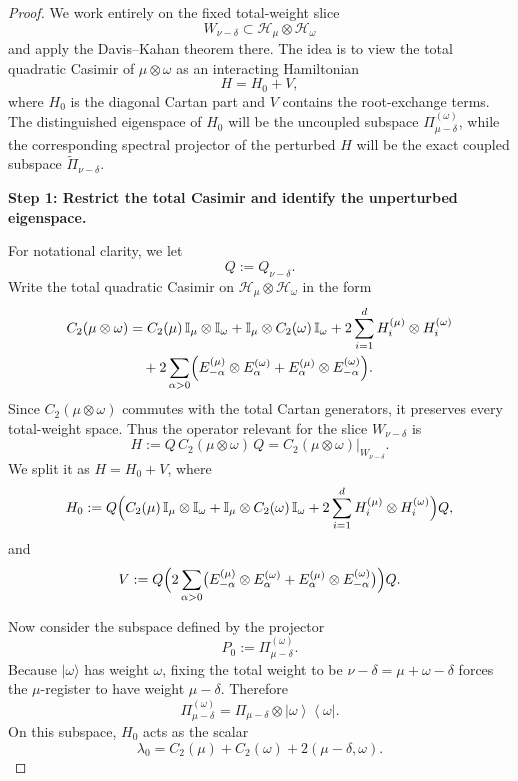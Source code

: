 \documentclass[a4paper,onecolumn,11pt]{quantumarticle}
\newcommand{\ket}[1]{| #1 \rangle}
\newcommand{\ketbra}[2]{\left|#1\right\rangle\!\!\left\langle #2\right|}
\def\id{\mathbb{I}}
\begin{document}
\begin{proof}
We work entirely on the fixed total-weight slice
\[
W_{\nu-\delta}\subset \mathcal H_\mu\otimes \mathcal H_\omega
\]
and apply the Davis--Kahan theorem there. The idea is to view the total quadratic Casimir of $\mu\otimes\omega$ as an interacting Hamiltonian
\[
H=H_0+V,
\]
where \(H_0\) is the diagonal Cartan part and \(V\) contains the root-exchange terms. The distinguished eigenspace of \(H_0\) will be the uncoupled subspace \(\Pi_{\mu-\delta}^{(\omega)}\), while the corresponding spectral projector of the perturbed \(H\) will be the exact coupled subspace \(\widetilde{\Pi}_{\nu-\delta}\).

\medskip
\noindent\textbf{Step 1: Restrict the total Casimir and identify the unperturbed eigenspace.}

For notational clarity, we let
\[
Q:=Q_{\nu-\delta}.
\]
Write the total quadratic Casimir on \(\mathcal H_\mu\otimes\mathcal H_\omega\) in the form
\begin{equation}
\begin{aligned}
    C_2(\mu\otimes\omega)
    &=
    C_2(\mu)\,\id_\mu\otimes \id_\omega
    + \id_\mu\otimes C_2(\omega)\,\id_\omega
    + 2\sum_{i=1}^d H_i^{(\mu)}\otimes H_i^{(\omega)} \\
    &\quad
    + 2\sum_{\alpha>0}
    \Bigl(
    E_{-\alpha}^{(\mu)}\otimes E_\alpha^{(\omega)}
    +
    E_\alpha^{(\mu)}\otimes E_{-\alpha}^{(\omega)}
    \Bigr).
\end{aligned}
\end{equation}
Since \(C_2(\mu\otimes\omega)\) commutes with the total Cartan generators, it preserves every total-weight space. Thus the operator relevant for the slice \(W_{\nu-\delta}\) is
\[
H:=Q\,C_2(\mu\otimes\omega)\,Q=C_2(\mu\otimes\omega)\big|_{W_{\nu-\delta}}.
\]
We split it as \(H=H_0+V\), where
\begin{equation}
    H_0
    :=
    Q\Bigl(
    C_2(\mu)\,\id_\mu\otimes \id_\omega
    + \id_\mu\otimes C_2(\omega)\,\id_\omega
    + 2\sum_{i=1}^d H_i^{(\mu)}\otimes H_i^{(\omega)}
    \Bigr)Q,
\end{equation}
and
\begin{equation}
    V
    :=
    Q\Bigl(
    2\sum_{\alpha>0}
    \bigl(
    E_{-\alpha}^{(\mu)}\otimes E_\alpha^{(\omega)}
    +
    E_\alpha^{(\mu)}\otimes E_{-\alpha}^{(\omega)}
    \bigr)
    \Bigr)Q.
\end{equation}

Now consider the subspace defined by the projector
\[
P_0:=\Pi_{\mu-\delta}^{(\omega)}.
\]
Because \(\ket{\omega}\) has weight \(\omega\), fixing the total weight to be \(\nu-\delta=\mu+\omega-\delta\) forces the \(\mu\)-register to have weight \(\mu-\delta\). Therefore
\begin{equation}\label{eq:proj_mu_omega}
    \Pi_{\mu-\delta}^{(\omega)}
    =
    \Pi_{\mu-\delta}\otimes \ketbra{\omega}{\omega}.
\end{equation}
On this subspace, \(H_0\) acts as the scalar
\begin{equation}\label{eq:lambda0_def}
    \lambda_0
    =
    C_2(\mu)+C_2(\omega)+2(\mu-\delta,\omega).
\end{equation}


\end{proof}
\end{document}
